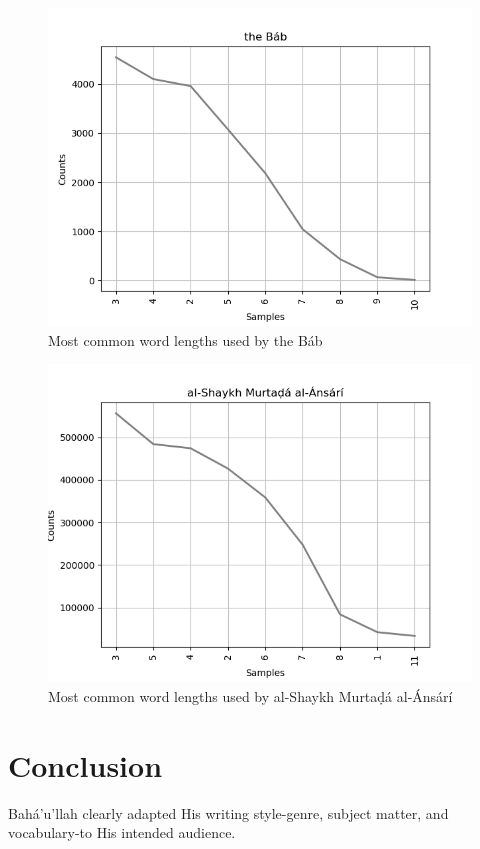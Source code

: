 \documentclass[12pt, oneside]{report}
\begin{document}
\begin{figure}[htb]
	\centering
	\includegraphics[width=15cm]{figures/word-length-bab.png}
	\caption[Most common word lengths used by the B\'{a}b]{Most common word lengths used by the B\'{a}b}
	\label{fig:word-length-bab}
\end{figure}
\begin{figure}[htb]
	\centering
	\includegraphics[width=15cm]{figures/word-length-shaykh-murtada.png}
	\caption[Most common word lengths used by al-Shaykh Murtaḍ\'{a} al-\'{A}ns\'{a}r\'{i}]{Most common word lengths used by al-Shaykh Murtaḍ\'{a} al-\'{A}ns\'{a}r\'{i}}
	\label{fig:word-length-murtada-ansari}
\end{figure}
\section{Conclusion}
Bah\'{a}'u'llah clearly adapted His writing style-genre, subject matter, and vocabulary-to His intended audience.
\end{document}
